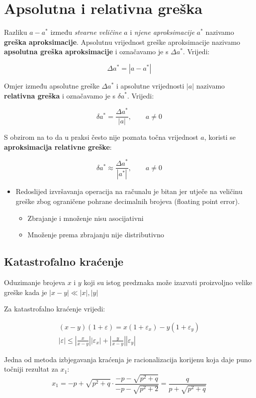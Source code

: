 \section{Apsolutna i relativna greška}

Razliku $a-a^*$ između \textit{stvarne veličine} $a$ i \textit{njene aproksimacije} $a^*$ nazivamo \textbf{greška aproksimacije}. Apsolutnu vrijednost greške aproksimacije nazivamo \textbf{apsolutna greška aproksimacije} i označavamo je s $\Delta a^*$. Vrijedi:

$$
\Delta a^* = |a-a^*|
$$

Omjer između apsolutne greške $\Delta a^*$ i apsolutne vrijednosti $|a|$ nazivamo \textbf{relativna greška} i označavamo je s $\delta a^*$. Vrijedi:

$$
\delta a^* = \frac{\Delta a^*}{|a|},\qquad a\neq0
$$

S obzirom na to da u praksi često nije poznata točna vrijednost $a$, koristi se \textbf{aproksimacija relativne greške}:

$$
\delta a^* \approx \frac{\Delta a^*}{|a^*|},\qquad a\neq0
$$

\begin{itemize}
    \item Redoslijed izvršavanja operacija na računalu je bitan jer utječe na veličinu greške zbog ograničene pohrane decimalnih brojeva (floating point error).
    \begin{itemize}
        \item Zbrajanje i množenje nisu asocijativni
        \item Množenje prema zbrajanju nije distributivno
    \end{itemize}
\end{itemize}

\subsection{Katastrofalno kraćenje}

Oduzimanje brojeva $x$ i $y$ koji su istog predznaka može izazvati proizvoljno velike greške kada je $|x-y| \ll |x|,|y|$

Za katastrofalno kraćenje vrijedi:

\begin{gather*}
(x-y)(1+\varepsilon) = x(1+\varepsilon_x) - y(1+\varepsilon_y)\\
|\varepsilon| \leq \left|\frac{x}{x-y}\right| |\varepsilon_x| + \left|\frac{y}{x-y}\right| |\varepsilon_y|
\end{gather*}

Jedna od metoda izbjegavanja kraćenja je racionalizacija korijenu koja daje puno točniji rezultat za $x_1$:
$$
    x_1=-p+\sqrt{p^2+q}\cdot\frac{-p-\sqrt{p^2+q}}{-p-\sqrt{p^2+2}}=\frac{q}{p+\sqrt{p^2+q}}
$$
